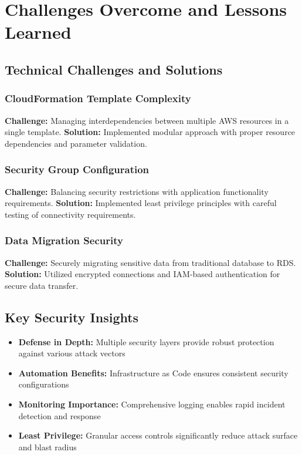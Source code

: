 \documentclass[12pt]{article}
\begin{document}
\section{Challenges Overcome and Lessons Learned}

\subsection{Technical Challenges and Solutions}

\subsubsection{CloudFormation Template Complexity}
\textbf{Challenge:} Managing interdependencies between multiple AWS resources in a single template.
\textbf{Solution:} Implemented modular approach with proper resource dependencies and parameter validation.

\subsubsection{Security Group Configuration}
\textbf{Challenge:} Balancing security restrictions with application functionality requirements.
\textbf{Solution:} Implemented least privilege principles with careful testing of connectivity requirements.

\subsubsection{Data Migration Security}
\textbf{Challenge:} Securely migrating sensitive data from traditional database to RDS.
\textbf{Solution:} Utilized encrypted connections and IAM-based authentication for secure data transfer.

\subsection{Key Security Insights}

\begin{itemize}
\item \textbf{Defense in Depth:} Multiple security layers provide robust protection against various attack vectors
\item \textbf{Automation Benefits:} Infrastructure as Code ensures consistent security configurations
\item \textbf{Monitoring Importance:} Comprehensive logging enables rapid incident detection and response
\item \textbf{Least Privilege:} Granular access controls significantly reduce attack surface and blast radius
\end{itemize}
\end{document}
